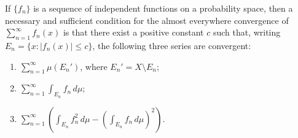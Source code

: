 If $\{f_n\}$ is a sequence of independent functions on a probability space, then a necessary and sufficient condition for the almost everywhere convergence of $\sum_{n=1}^{\infty} f_n(x)$ is that there exist a positive constant $c$ such that, writing $E_n = \{x : |f_n(x)| \leq c\}$, the following three series are convergent:

\begin{enumerate}
  \item[(a)] $\displaystyle\sum_{n=1}^{\infty} \mu(E_n')$, where $E_n' = X \setminus E_n$;
  \item[(b)] $\displaystyle\sum_{n=1}^{\infty} \int_{E_n} f_n \, d\mu$;
  \item[(c)] $\displaystyle\sum_{n=1}^{\infty} \left( \int_{E_n} f_n^2 \, d\mu - \left( \int_{E_n} f_n \, d\mu \right)^2 \right)$.
\end{enumerate}
